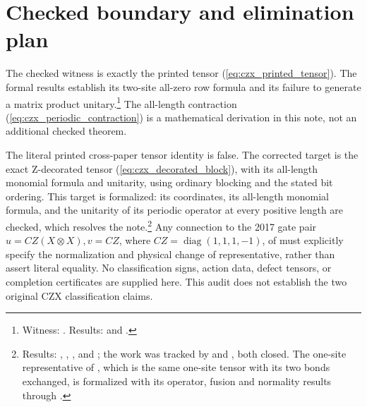 \documentclass{article}
\begin{document}
\section{Checked boundary and elimination plan}
The checked witness is exactly the printed tensor
(\ref{eq:czx_printed_tensor}). The formal results establish its two-site
all-zero row formula and its failure to generate a matrix product
unitary.\footnote{Witness: .
    Results:  and
    .}
The all-length contraction (\ref{eq:czx_periodic_contraction}) is a
mathematical derivation in this note, not an additional checked theorem.

The literal printed cross-paper tensor identity is false. The corrected
target is the exact Z-decorated tensor
(\ref{eq:czx_decorated_block}), with its all-length monomial formula and
unitarity, using ordinary blocking and the stated bit ordering. This
target is formalized: its coordinates, its all-length monomial formula,
and the unitarity of its periodic operator at every positive length are
checked, which resolves the note.\footnote{Results:
    , ,
    ,
     and
    ; the work was tracked by
     and , both closed. The one-site
    representative of \cite{GarreRubioSchuch2024DomainWall}, which is the
    same one-site tensor with its two bonds exchanged, is formalized with its
    operator, fusion and normality results through
    .}
Any connection to the 2017 gate pair
$u=CZ(X\otimes X), v=CZ$, where $CZ=\operatorname{diag}(1,1,1,-1)$,
of \cite{Cirac2017MPU} must explicitly specify the normalization and
physical change of representative, rather than assert literal equality.
No classification signs, action data, defect tensors, or completion
certificates are supplied here. This audit does not establish the two
original CZX classification claims.
\end{document}
